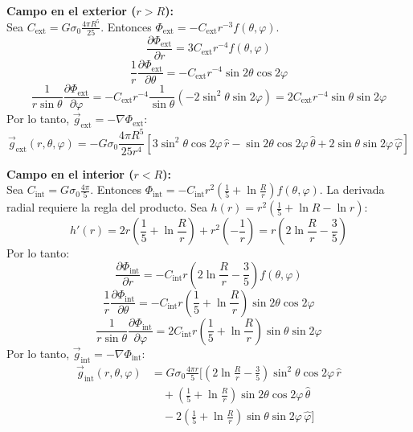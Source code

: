 \documentclass[a4paper]{article}
\begin{document}
\textbf{Campo en el exterior ($r > R$):} \\
Sea $C_{\text{ext}} = G \sigma_0 \frac{4\pi R^5}{25}$. Entonces $\Phi_{\text{ext}} = -C_{\text{ext}} r^{-3} f(\theta, \varphi)$.
$$
\frac{\partial \Phi_{\text{ext}}}{\partial r} = 3 C_{\text{ext}} r^{-4} f(\theta, \varphi)
$$
$$
\frac{1}{r} \frac{\partial \Phi_{\text{ext}}}{\partial \theta} = -C_{\text{ext}} r^{-4} \sin 2\theta \cos 2\varphi
$$
$$
\frac{1}{r \sin\theta} \frac{\partial \Phi_{\text{ext}}}{\partial \varphi} = -C_{\text{ext}} r^{-4} \frac{1}{\sin\theta} (-2\sin^2\theta \sin 2\varphi) = 2 C_{\text{ext}} r^{-4} \sin\theta \sin 2\varphi
$$
Por lo tanto, $\vec{g}_{\text{ext}} = -\nabla \Phi_{\text{ext}}$:
$$
\vec{g}_{\text{ext}}(r, \theta, \varphi) = -G \sigma_0 \frac{4\pi R^5}{25 r^4} \left[ 3 \sin^2\theta \cos 2\varphi \, \hat{r} - \sin 2\theta \cos 2\varphi \, \hat{\theta} + 2 \sin\theta \sin 2\varphi \, \hat{\varphi} \right]
$$

\textbf{Campo en el interior ($r < R$):} \\
Sea $C_{\text{int}} = G \sigma_0 \frac{4\pi}{5}$. Entonces $\Phi_{\text{int}} = -C_{\text{int}} r^2 \left( \frac{1}{5} + \ln\frac{R}{r} \right) f(\theta, \varphi)$.
La derivada radial requiere la regla del producto. Sea $h(r) = r^2 \left( \frac{1}{5} + \ln R - \ln r \right)$:
$$
h'(r) = 2r \left( \frac{1}{5} + \ln\frac{R}{r} \right) + r^2 \left( -\frac{1}{r} \right) = r \left( 2\ln\frac{R}{r} - \frac{3}{5} \right)
$$
Por lo tanto:
$$
\frac{\partial \Phi_{\text{int}}}{\partial r} = -C_{\text{int}} r \left( 2\ln\frac{R}{r} - \frac{3}{5} \right) f(\theta, \varphi)
$$
$$
\frac{1}{r} \frac{\partial \Phi_{\text{int}}}{\partial \theta} = -C_{\text{int}} r \left( \frac{1}{5} + \ln\frac{R}{r} \right) \sin 2\theta \cos 2\varphi
$$
$$
\frac{1}{r \sin\theta} \frac{\partial \Phi_{\text{int}}}{\partial \varphi} = 2 C_{\text{int}} r \left( \frac{1}{5} + \ln\frac{R}{r} \right) \sin\theta \sin 2\varphi
$$
Por lo tanto, $\vec{g}_{\text{int}} = -\nabla \Phi_{\text{int}}$:
\[
\begin{aligned}
\vec{g}_{\text{int}}(r, \theta, \varphi)
&= G \sigma_0 \frac{4\pi r}{5} \Bigg[
\left( 2\ln\frac{R}{r} - \frac{3}{5} \right) \sin^2\theta \cos 2\varphi \, \hat{r} \\
&\quad + \left( \frac{1}{5} + \ln\frac{R}{r} \right) \sin 2\theta \cos 2\varphi \, \hat{\theta} \\
&\quad - 2 \left( \frac{1}{5} + \ln\frac{R}{r} \right) \sin\theta \sin 2\varphi \, \hat{\varphi}
\Bigg]
\end{aligned}
\]
\end{document}
